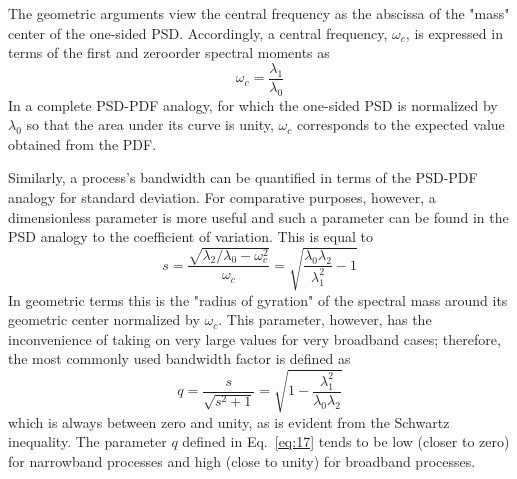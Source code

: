 \documentclass{article}
\begin{document}
The geometric arguments view the central frequency as the abscissa of the
"mass" center of the one-sided PSD. Accordingly, a central frequency,
$\omega_c$, is expressed in terms of the first and zeroorder spectral moments
as
\begin{equation}
  \omega_c = \frac{\lambda_1}{\lambda_0} \label{eq:15}
\end{equation}
In a complete PSD-PDF analogy, for which the one-sided PSD is normalized by
$\lambda_0$ so that the area under its curve is unity, $\omega_c$ corresponds
to the expected value obtained from the PDF.

Similarly, a process's bandwidth can be quantified in terms of the PSD-PDF
analogy for standard deviation. For comparative purposes, however, a
dimensionless parameter is more useful and such a parameter can be found in
the PSD analogy to the coefficient of variation. This is equal to
\begin{equation}
  s = \frac{\sqrt{\lambda_2 / \lambda_0 - \omega_c^2}}{\omega_c} =
  \sqrt{\frac{\lambda_0 \lambda_2}{\lambda_1^2} - 1} \label{eq:16}
\end{equation}
In geometric terms this is the "radius of gyration" of the spectral mass
around its geometric center normalized by $\omega_c$. This parameter, however,
has the inconvenience of taking on very large values for very broadband cases;
therefore, the most commonly used bandwidth factor is defined as
\begin{equation}
  q = \frac{s}{\sqrt{s^2 + 1}} = \sqrt{1 - \frac{\lambda_1^2}{\lambda_0
  \lambda_2}} \label{eq:17}
\end{equation}
which is always between zero and unity, as is evident from the Schwartz
inequality. The parameter $q$ defined in Eq.~\eqref{eq:17} tends to be low
(closer to zero) for narrowband processes and high (close to unity) for
broadband processes.
\end{document}
